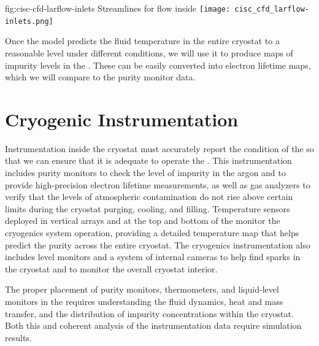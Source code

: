 \begin{dunefigure}{fig:cisc-cfd-larflow-inlets}
  {Streamlines for  flow inside  }
  \texttt{[image: cisc\_cfd\_larflow-inlets.png]}
\end{dunefigure}



Once the   model %
predicts the fluid temperature in the entire cryostat to a reasonable level under different conditions, we will use it %
to produce maps of impurity levels in the . These can be easily converted into electron lifetime maps, which we will %
compare to the %
 purity monitor data. 


\section{Cryogenic Instrumentation}
\label{sec:fdgen-cryo-instr}
Instrumentation inside the cryostat must accurately report the condition of the  so that we can ensure that it is adequate to operate the .
This instrumentation includes %
purity monitors %
to check the level of impurity in the argon and %
to provide high-precision electron lifetime measurements,
as well as gas analyzers to verify that the levels of atmospheric contamination do not rise above %
certain limits during the cryostat purging, cooling, and filling. 
Temperature sensors deployed in vertical arrays and at the top and bottom of the  monitor the cryogenics system operation, providing a 
detailed \threed temperature map that helps predict the  purity across the entire cryostat. The cryogenics instrumentation also includes  level monitors and
a system of internal cameras to help find sparks in the cryostat and %
to monitor the overall cryostat interior. 

The proper placement of purity monitors, thermometers, and liquid-level monitors in the  requires %
understanding the  fluid dynamics, heat and mass transfer, and the distribution of impurity concentrations within the cryostat. %
Both this and %
coherent analysis of the instrumentation data require  simulation results.

